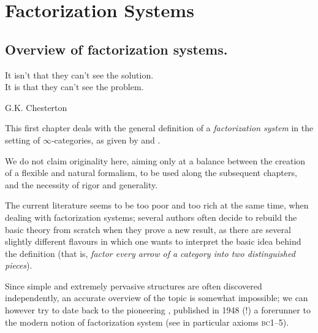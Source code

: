 \chapter{Factorization Systems}\label{chap:effe.esse}
\thispagestyle{empty}
\section{Overview of factorization systems.}
\setlength{\epigraphwidth}{.75\textwidth}
\epigraph{It isn't that they can't see the solution.\\ It is that they can't see the problem.}{G.K. Chesterton}
This first chapter deals with the general definition of a \emph{factorization system} in the setting of $\infty$\hyp{}categories, as given by \cite{HTT} and \cite[ \textbf{178}]{Joy}.

We do not claim originality here, aiming only at a balance between the creation of a flexible and natural formalism, to be used along the subsequent chapters, and the necessity of rigor and generality.

The current literature seems to be too poor and too rich at the same time, when dealing with factorization systems; several authors often decide to rebuild the basic theory from scratch when they prove a new result, as there are several slightly different flavours in which one wants to interpret the basic idea behind the definition (that is, \emph{factor every arrow of a category into two distinguished pieces}). 

Since simple and extremely pervasive structures are often discovered independently, an accurate overview of the topic is somewhat impossible; we can however try to date back to the pioneering \cite{maclane1948groups}, published in 1948 (!) a forerunner to the modern notion of factorization system (see in particular axioms \textsc{bc}1--5).


